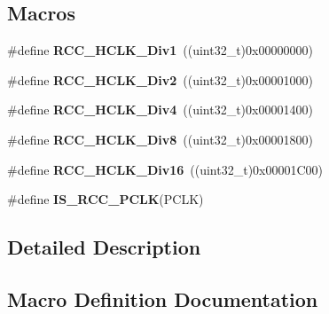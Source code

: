 \subsection*{Macros}
\begin{DoxyCompactItemize}
\item 
\mbox{\label{group___r_c_c___a_p_b1___a_p_b2___clock___source_gae62b4a39ae69cc221f2ab7d4518bfb76}} 
\#define {\bfseries R\+C\+C\+\_\+\+H\+C\+L\+K\+\_\+\+Div1}~((uint32\+\_\+t)0x00000000)
\item 
\mbox{\label{group___r_c_c___a_p_b1___a_p_b2___clock___source_ga177bb3648def9a961c16f93f15ca0f62}} 
\#define {\bfseries R\+C\+C\+\_\+\+H\+C\+L\+K\+\_\+\+Div2}~((uint32\+\_\+t)0x00001000)
\item 
\mbox{\label{group___r_c_c___a_p_b1___a_p_b2___clock___source_gafd8cf0e32a3ea5648cdc054766bc2017}} 
\#define {\bfseries R\+C\+C\+\_\+\+H\+C\+L\+K\+\_\+\+Div4}~((uint32\+\_\+t)0x00001400)
\item 
\mbox{\label{group___r_c_c___a_p_b1___a_p_b2___clock___source_gab2e2b6e0b8fe22d6638b672918b22097}} 
\#define {\bfseries R\+C\+C\+\_\+\+H\+C\+L\+K\+\_\+\+Div8}~((uint32\+\_\+t)0x00001800)
\item 
\mbox{\label{group___r_c_c___a_p_b1___a_p_b2___clock___source_ga6353aaa0b302fdd5d946fd21756e2273}} 
\#define {\bfseries R\+C\+C\+\_\+\+H\+C\+L\+K\+\_\+\+Div16}~((uint32\+\_\+t)0x00001\+C00)
\item 
\#define {\bfseries I\+S\+\_\+\+R\+C\+C\+\_\+\+P\+C\+LK}(P\+C\+LK)
\end{DoxyCompactItemize}


\subsection{Detailed Description}


\subsection{Macro Definition Documentation}
\mbox{\label{group___r_c_c___a_p_b1___a_p_b2___clock___source_gab70f1257ea47c1da4def8e351af4d9f2}} 
